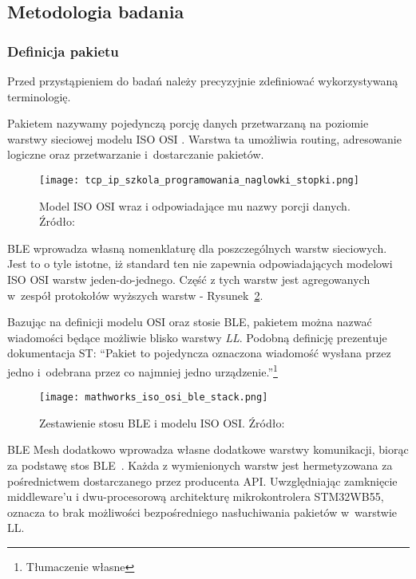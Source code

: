 \subsection{Metodologia badania}
\subsubsection{Definicja pakietu}
Przed przystąpieniem do badań należy precyzyjnie zdefiniować wykorzystywaną terminologię.

Pakietem nazywamy pojedynczą porcję danych przetwarzaną na poziomie warstwy sieciowej modelu ISO OSI \cite{sa_tcpip_nodate}.
Warstwa ta umożliwia routing, adresowanie logiczne oraz przetwarzanie i~dostarczanie pakietów.

\begin{figure}[!ht]
	\centering \texttt{[image: tcp\_ip\_szkola\_programowania\_naglowki\_stopki.png]} 
	\caption{Model ISO OSI wraz i odpowiadające mu nazwy porcji danych. Źródło: \cite{sa_tcpip_nodate}}
	\label{rys:iso_osi_model_nazwy_grup_danych}
\end{figure}

\gls{BLE} wprowadza własną nomenklaturę dla poszczególnych warstw sieciowych. Jest to o tyle istotne, iż standard ten
nie zapewnia odpowiadających modelowi ISO OSI warstw jeden-do-jednego. Część z tych warstw jest agregowanych w~zespół 
protokołów wyższych warstw - Rysunek~\ref{rys:agregacja_protokolow_ble}. 

Bazując na definicji modelu OSI oraz stosie BLE, pakietem można nazwać wiadomości będące możliwie blisko
warstwy \textit{\gls{LL}}. Podobną definicję prezentuje dokumentacja ST:
\enquote{Pakiet to pojedyncza oznaczona wiadomość wysłana przez jedno i~odebrana przez 
co najmniej jedno urządzenie.}\footnote{Tłumaczenie własne}~\cite{stmicroelectronics_pm0271_2021}

\begin{figure}[!ht]
	\centering \texttt{[image: mathworks\_iso\_osi\_ble\_stack.png]} 
	\caption{Zestawienie stosu BLE i modelu ISO OSI. Źródło: \cite{noauthor_bluetooth_nodate}}
	\label{rys:agregacja_protokolow_ble}
\end{figure}

BLE Mesh dodatkowo wprowadza własne dodatkowe warstwy komunikacji, biorąc za podstawę stos BLE~\cite{mesh_working_group_mesh_2019}.
Każda z wymienionych warstw jest hermetyzowana za pośrednictwem dostarczanego przez producenta \gls{API}.
Uwzględniając zamknięcie middleware'u i dwu-procesorową architekturę mikrokontrolera STM32WB55, oznacza 
to brak możliwości bezpośredniego nasłuchiwania pakietów w~warstwie \gls{LL}.

